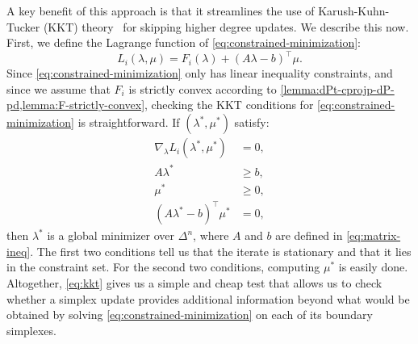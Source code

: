 \documentclass[eikonal.tex]{subfiles}
\begin{document}
A key benefit of this approach is that it streamlines the use of
Karush-Kuhn-Tucker (KKT) theory~\cite{nocedal2006numerical} for
skipping higher degree updates. We describe this now. First, we define
the Lagrange function of \cref{eq:constrained-minimization}:
\begin{equation}
  L_i(\lambda, \mu) = F_i(\lambda) + {(A\lambda - b)}^\top \mu.
\end{equation}
Since \cref{eq:constrained-minimization} only has linear inequality
constraints, and since we assume that $F_i$ is strictly convex
according to \cref{lemma:dPt-cprojp-dP-pd,lemma:F-strictly-convex},
checking the KKT conditions for \cref{eq:constrained-minimization} is
straightforward. If $(\lambda^*, \mu^*)$ satisfy:
\begin{equation}
  \label{eq:kkt}
  \begin{split}
    \nabla_\lambda L_i(\lambda^*, \mu^*) &= 0, \\
    A\lambda^* &\geq b, \\
    \mu^* &\geq 0, \\
    (A\lambda^* - b)^\top \mu^* &= 0,
  \end{split}
\end{equation}
then $\lambda^*$ is a global minimizer over $\Delta^n$, where $A$ and
$b$ are defined in \cref{eq:matrix-ineq}. The first two conditions
tell us that the iterate is stationary and that it lies in the
constraint set. For the second two conditions, computing $\mu^*$ is
easily done. Altogether, \cref{eq:kkt} gives us a simple and cheap
test that allows us to check whether a simplex update provides
additional information beyond what would be obtained by solving
\cref{eq:constrained-minimization} on each of its boundary simplexes.
\end{document}
